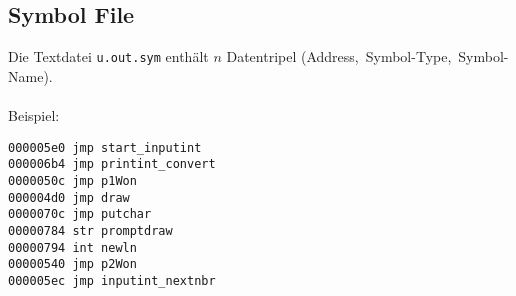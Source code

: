 \subsection{Symbol File}

\begin{frame}[fragile]{\insertsubsection}
    Die Textdatei \texttt{u.out.sym} enthält $n$ Datentripel (Address,~Symbol-Type,~Symbol-Name).
    \\~\\
    Beispiel:
\begin{verbatim}
000005e0 jmp start_inputint
000006b4 jmp printint_convert
0000050c jmp p1Won
000004d0 jmp draw
0000070c jmp putchar
00000784 str promptdraw
00000794 int newln
00000540 jmp p2Won
000005ec jmp inputint_nextnbr
\end{verbatim}
\end{frame}
